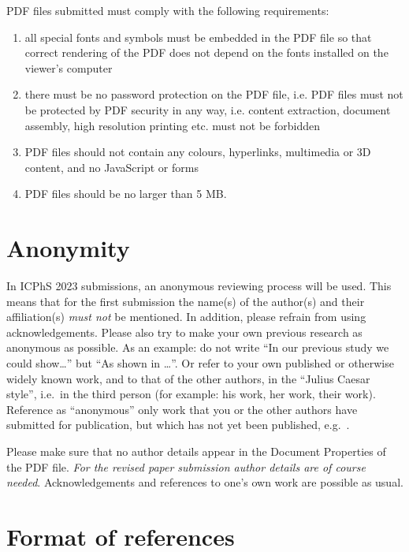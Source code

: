 \documentclass[
  a4paper,
  11pt,
  twocolumn]{article}
\begin{document}
PDF files submitted must comply with the following requirements:

\begin{enumerate}
\item all special fonts and symbols must be embedded in the PDF
  file so that correct rendering of the PDF does not depend on the
  fonts installed on the viewer's computer
\item there must be no
  password protection on the PDF file, i.e. PDF files must not be
  protected by PDF security in any way, i.e. content extraction,
  document assembly, high resolution printing etc. must not be
  forbidden
\item PDF files should not contain any colours, hyperlinks,
  multimedia or 3D content, and no JavaScript or forms
\item PDF files
  should be no larger than 5 MB.
\end{enumerate}

\section{Anonymity}

In ICPhS 2023 submissions, an anonymous reviewing process will be used.
This means that for the first submission the name(s) of the author(s)
and their affiliation(s) \emph{must not} be mentioned. In addition,
please refrain from using acknowledgements. Please also try to make your
own previous research as anonymous as possible. As an example: do not
write ``In our previous study \cite{Stevens:1999} we could show\ldots''
but ``As shown in \cite{Stevens:1999}\ldots''. Or refer to your own
published or otherwise widely known work, and to that of the other
authors, in the ``Julius Caesar style'', i.e.~in the third person (for
example: his work, her work, their work). Reference as ``anonymous''
only work that you or the other authors have submitted for publication,
but which has not yet been published, e.g.~\cite{Anonymous:submitted}.

Please make sure that no author details appear in the Document
Properties of the PDF file.
\emph{For the revised paper submission author details are of course needed}.
Acknowledgements and references to one's own work are possible as usual.

\section{Format of references}
\end{document}
